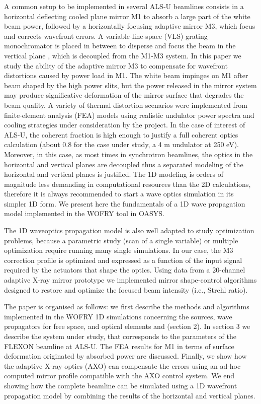 \documentclass{iucr}              %
\begin{document}
A common setup to be implemented in several ALS-U beamlines consists in a horizontal deflecting cooled plane mirror M1 to absorb a large part of the white beam power, followed by a horizontally focusing adaptive mirror M3, which focus and corrects wavefront errors. A variable-line-space (VLS) grating monochromator is placed in between to disperse and focus the beam in the vertical plane \cite{reininger2005}, which is decoupled from the M1-M3 system. In this paper we study the ability of the adaptive mirror M3 to compensate for wavefront distortions caused by power load in M1. The white beam impinges on M1 after beam shaped by the high power slits, but the power released in the mirror system may produce significative deformation of the mirror surface that degrades the beam quality. 
A variety of thermal distortion scenarios were implemented from finite-element analysis (FEA) models using realistic undulator power spectra and cooling strategies under consideration by the project.
In the case of interest of ALS-U, the coherent fraction is high enough  to justify a full coherent optics calculation (about 0.8 for the case under study, a 4 m undulator at 250 eV). Moreover, in this case, as most times in synchrotron beamlines, the optics in the horizontal and vertical planes are decoupled thus a separated modeling of the horizontal and vertical planes is justified. The 1D modeling is orders of magnitude less demanding in computational resources than the 2D calculations, therefore it is always recommended to start a wave optics simulation in its simpler 1D form. We present here the fundamentals of a 1D wave propagation model implemented in the WOFRY \cite{codeWOFRY} tool in OASYS. 

The 1D waveoptics propagation model is also well adapted to study optimization problems, because a parametric study (scan of a single variable) or multiple optimization require running many single simulations. In our case, the M3 correction profile is optimized and expressed as a function of the input signal required by the actuators that shape the optics. 
Using data from a 20-channel adaptive X-ray mirror prototype we implemented mirror shape-control algorithms designed to restore and optimize the focused beam intensity (i.e., Strehl ratio).

The paper is organised as follows: we first describe the methods and algorithms implemented in the WOFRY 1D simulations concerning the sources, wave propagators for free space, and optical elements and (section 2). In section 3 we describe the system under study, that corresponds to the parameters of the FLEXON beamline at ALS-U. The FEA results for M1 in terms of surface deformation originated by absorbed power are discussed. Finally, we show how the adaptive X-ray optics (AXO) can compensate the errors using an ad-hoc computed mirror profile compatible with the AXO control system. We end showing how the complete beamline can be simulated using a 1D wavefront propagation model by combining the results of the horizontal and vertical planes.  
\end{document}
